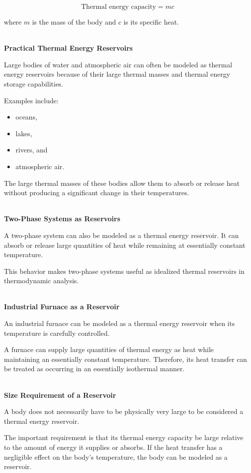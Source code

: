 \documentclass[12pt]{article}
\begin{document}
\begin{equation*}
\text{Thermal energy capacity} = m c
\end{equation*}

where $m$ is the mass of the body and $c$ is its specific heat.

\textbf{\\ Practical Thermal Energy Reservoirs}

Large bodies of water and atmospheric air can often be modeled as thermal energy reservoirs because of their large thermal masses and thermal energy storage capabilities.

Examples include:

\begin{itemize}
    \item oceans,
    \item lakes,
    \item rivers, and
    \item atmospheric air.
\end{itemize}

The large thermal masses of these bodies allow them to absorb or release heat without producing a significant change in their temperatures.

\textbf{\\ Two-Phase Systems as Reservoirs}

A two-phase system can also be modeled as a thermal energy reservoir. It can absorb or release large quantities of heat while remaining at essentially constant temperature.

This behavior makes two-phase systems useful as idealized thermal reservoirs in thermodynamic analysis.

\textbf{\\ Industrial Furnace as a Reservoir}

An industrial furnace can be modeled as a thermal energy reservoir when its temperature is carefully controlled.

A furnace can supply large quantities of thermal energy as heat while maintaining an essentially constant temperature. Therefore, its heat transfer can be treated as occurring in an essentially isothermal manner.

\textbf{\\ Size Requirement of a Reservoir}

A body does not necessarily have to be physically very large to be considered a thermal energy reservoir.

The important requirement is that its thermal energy capacity be large relative to the amount of energy it supplies or absorbs. If the heat transfer has a negligible effect on the body's temperature, the body can be modeled as a reservoir.
\end{document}
